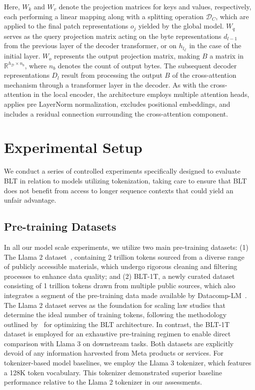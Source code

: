 Here, $W_k$ and $W_v$ denote the projection matrices for keys and values, respectively, each performing a linear mapping along with a splitting operation $\mathcal{D}_C$, which are applied to the final patch representations $o_j$ yielded by the global model. $W_q$ serves as the query projection matrix acting on the byte representations $d_{l-1}$ from the previous layer of the decoder transformer, or on $h_{l_{\mathcal{E}}}$ in the case of the initial layer. $W_o$ represents the output projection matrix, making $B$ a matrix in $\mathbb{R}^{h_{\mathcal{D}} \times n_b}$, where $n_b$ denotes the count of output bytes. The subsequent decoder representations $D_l$ result from processing the output $B$ of the cross-attention mechanism through a transformer layer in the decoder. As with the cross-attention in the local encoder, the architecture employs multiple attention heads, applies pre LayerNorm normalization, excludes positional embeddings, and includes a residual connection surrounding the cross-attention component.

\section{Experimental Setup}
\label{section:experiments}
We conduct a series of controlled experiments specifically designed to evaluate {\textsc BLT} in relation to models utilizing tokenization, taking care to ensure that {\textsc BLT} does not benefit from access to longer sequence contexts that could yield an unfair advantage.

\subsection{Pre-training Datasets} In all our model scale experiments, we utilize two main pre-training datasets: (1) The Llama 2 dataset~\citep{touvron2023llama}, containing 2 trillion tokens sourced from a diverse range of publicly accessible materials, which undergo rigorous cleaning and filtering processes to enhance data quality; and (2) {\textsc BLT}-1T, a newly curated dataset consisting of 1 trillion tokens drawn from multiple public sources, which also integrates a segment of the pre-training data made available by Datacomp-LM~\citep{li2024datacomp}. The Llama 2 dataset serves as the foundation for scaling law studies that determine the ideal number of training tokens, following the methodology outlined by~\cite{dubey2024llama} for optimizing the {\textsc BLT} architecture. In contrast, the {\textsc BLT}-1T dataset is employed for an exhaustive pre-training regimen to enable direct comparison with Llama 3 on downstream tasks. Both datasets are explicitly devoid of any information harvested from Meta products or services. For tokenizer-based model baselines, we employ the Llama 3 tokenizer, which features a 128K token vocabulary. This tokenizer demonstrated superior baseline performance relative to the Llama 2 tokenizer in our assessments.

